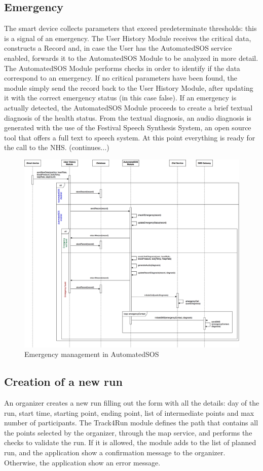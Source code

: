 \subsection{Emergency}

The smart device collects parameters that exceed predeterminate thresholds: this is a signal of an emergency.
The User History Module receives the critical data, constructs a Record and, in case the User has the AutomatedSOS service enabled, forwards it to the AutomatedSOS Module to be analyzed in more detail.
The AutomatedSOS Module performs checks in order to identify if the data correspond to an emergency. If no critical parameters have been found, the module simply send the record back to the User History Module, after updating it with the correct emergency status (in this case false). If an emergency is actually detected, the AutomatedSOS Module proceeds to create a brief textual diagnosis of the health status. From the textual diagnosis, an audio diagnosis is generated with the use of the Festival Speech Synthesis System, an open source tool that offers a full text to speech system. At this point everything is ready for the call to the NHS. (continues...)

\begin{figure}[H]
    \centering
    \includegraphics[scale=0.16]{./Pictures/sequence-emergency.png}
    \caption{Emergency management in AutomatedSOS}
\end{figure}

\subsection{Creation of a new run}
An organizer creates a new run filling out the form with all the details: day of the run, start time, starting point, ending point, list of intermediate points and max number of participants. The Track4Run module defines the path that contains all the points selected by the organizer, through the map service, and performs the checks to validate the run. If it is allowed, the module adds to the list of planned run, and the application show a confirmation message to the organizer. Otherwise, the application show an error message.

